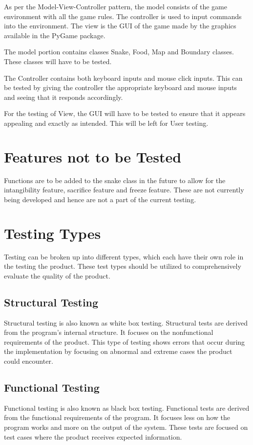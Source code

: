 \documentclass[12pt]{article}
\begin{document}
As per the Model-View-Controller pattern, the model consists of the game environment with all the game rules. The controller is used to input commands into the environment. The view is the GUI of the game made by the graphics available in the PyGame package.

The model portion contains classes Snake, Food, Map and Boundary classes. These classes will have to be tested.

The Controller contains both keyboard inputs and mouse click inputs. This can be tested by giving the controller the appropriate keyboard and mouse inputs and seeing that it responds accordingly.

For the testing of View, the GUI will have to be tested to ensure that it appears appealing and exactly as intended. This will be left for User testing.
\section{Features not to be Tested}
Functions are to be added to the snake class in the future to allow for the intangibility feature, sacrifice feature and freeze feature. These are not currently being developed and hence are not a part of the current testing.

\section{Testing Types}
Testing can be broken up into different types, which each have their own role in the testing the product. These test types should be utilized to comprehensively evaluate the quality of the product.
\subsection{Structural Testing}
Structural testing  is also known as white box testing. Structural tests are derived from the program's internal structure. It focuses on the nonfunctional requirements of the product. This type of testing shows errors that occur during the implementation by focusing on abnormal and extreme cases the product could encounter.
\subsection{Functional Testing}
Functional testing is also known as black box testing. Functional tests are derived from the functional requirements of the program. It focuses less on how the program works and more on the output of the system. These tests are focused on test cases where the product receives expected information.
\end{document}
